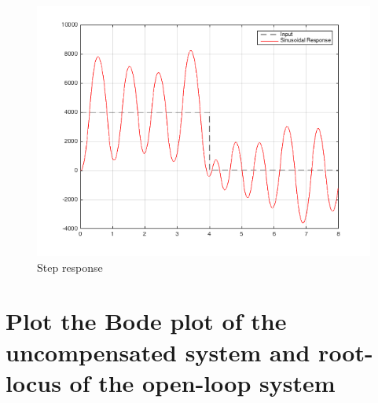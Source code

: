 \documentclass[a4paper, 12pt]{article}
\begin{document}
\begin{figure}[!htbp]
\centering
\includegraphics[scale = 0.6]{LabStepResponseNoControl}
\caption{Step response}
\label{LabStepResponseNoControl}
\end{figure}


\section{Plot the Bode plot of the uncompensated system and root-locus of the open-loop system}
\end{document}
